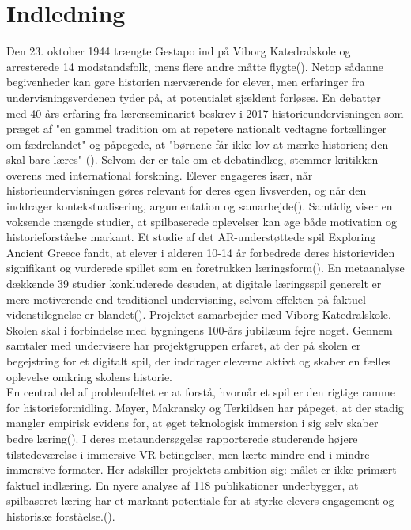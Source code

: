 \section{Indledning}


Den 23. oktober 1944 trængte Gestapo ind på Viborg Katedralskole og arresterede 14 modstandsfolk, mens flere andre måtte flygte(\cite{katedralskole2026}). Netop sådanne begivenheder kan gøre historien nærværende for elever, men erfaringer fra undervisningsverdenen tyder på, at potentialet sjældent forløses. En debattør med 40 års erfaring fra lærerseminariet beskrev i 2017 historieundervisningen som præget af "en gammel tradition om at repetere nationalt vedtagne fortællinger om fædrelandet" og påpegede, at "børnene får ikke lov at mærke historien; den skal bare læres" (\cite{ronhede2017historiefaget}). Selvom der er tale om et debatindlæg, stemmer kritikken overens med international forskning. Elever engageres især, når historieundervisningen gøres relevant for deres egen livsverden, og når den inddrager kontekstualisering, argumentation og samarbejde(\cite{VanDoorsselaere2025}). Samtidig viser en voksende mængde studier, at spilbaserede oplevelser kan øge både motivation og historieforståelse markant. Et studie af det AR-understøttede spil Exploring Ancient Greece fandt, at elever i alderen 10-14 år forbedrede deres historieviden signifikant og vurderede spillet som en foretrukken læringsform(\cite{Bekas2024}). En metaanalyse dækkende 39 studier konkluderede desuden, at digitale læringsspil generelt er mere motiverende end traditionel undervisning, selvom effekten på faktuel videnstilegnelse er blandet(\cite{Wouters2013}). Projektet samarbejder med Viborg Katedralskole. Skolen skal i forbindelse med bygningens 100-års jubilæum fejre noget. Gennem samtaler med undervisere har projektgruppen erfaret, at der på skolen er begejstring for et digitalt spil, der inddrager eleverne aktivt og skaber en fælles oplevelse omkring skolens historie. \\ En central del af problemfeltet er at forstå, hvornår et spil er den rigtige ramme for historieformidling. Mayer, Makransky og Terkildsen har påpeget, at der stadig mangler empirisk evidens for, at øget teknologisk immersion i sig selv skaber bedre læring(\cite{Mayer2022}). I deres metaundersøgelse rapporterede studerende højere tilstedeværelse i immersive VR-betingelser, men lærte mindre end i mindre immersive formater. Her adskiller projektets ambition sig: målet er ikke primært faktuel indlæring. En nyere analyse af 118 publikationer underbygger, at spilbaseret læring har et markant potentiale for at styrke elevers engagement og historiske forståelse.(\cite{Lai2025}).


